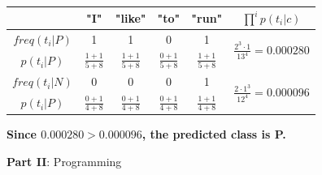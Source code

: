 \documentclass{article}
\begin{document}
\begin{enumerate}[leftmargin=\labelsep]
\begin{table}[H]
  \centering
  \begin{tabular}{ccccc|c}
     & "I" & "like" & "to" & "run" & $\prod^ip(t_i|c)$ \\ \toprule
    $freq(t_i | P)$ & 1 & 1 & 0 & 1 & \multirow{2}{*}{$\frac{2^3\cdot 1}{13^4}=0.000280$} \\
    $p(t_i|P)$      & $\frac{1+1}{5+8}$ & $\frac{1+1}{5+8}$ & $\frac{0+1}{5+8}$ & $\frac{1+1}{5+8}$ \\ \midrule
    $freq(t_i | N)$ & 0 & 0 & 0 & 1 & \multirow{2}{*}{$\frac{2\cdot 1^3}{12^4}=0.000096$} \\
    $p(t_i|P)$      & $\frac{0+1}{4+8}$ & $\frac{0+1}{4+8}$ & $\frac{0+1}{4+8}$ & $\frac{1+1}{4+8}$ \\
  \end{tabular}
\end{table}

\textbf{
  Since $0.000280 > 0.000096$, the predicted class is P.
}

\centering
{}
\end{enumerate}

\large{\textbf{Part II}: Programming}\normalsize
\end{document}
